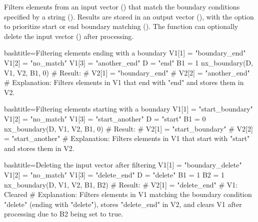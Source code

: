 \begin{NexMainBox}
	\begin{NexMainBox}
		Filters elements from an input vector () that match the boundary conditions specified by a string (). Results are stored in an output vector (), with the option to prioritize start or end boundary matching (). The function can optionally delete the input vector () after processing.
	\end{NexMainBox}
	\begin{NexMainBox}
		\begin{NexListDark}
		\end{NexListDark}
	\end{NexMainBox}
\end{NexMainBox}

\begin{NexCodeBox}{bash}{title={Filtering elements ending with a boundary}}
	V1[1] = "boundary_end"
	V1[2] = "no_match"
	V1[3] = "another_end"
	D = "end"
	B1 = 1
	nx_boundary(D, V1, V2, B1, 0)
	# Result:
	# V2[1] = "boundary_end"
	# V2[2] = "another_end"
	# Explanation: Filters elements in V1 that end with "end" and stores them in V2.
\end{NexCodeBox}

\begin{NexCodeBox}{bash}{title={Filtering elements starting with a boundary}}
	V1[1] = "start_boundary"
	V1[2] = "no_match"
	V1[3] = "start_another"
	D = "start"
	B1 = 0
	nx_boundary(D, V1, V2, B1, 0)
	# Result:
	# V2[1] = "start_boundary"
	# V2[2] = "start_another"
	# Explanation: Filters elements in V1 that start with "start" and stores them in V2.
\end{NexCodeBox}

\begin{NexCodeBox}{bash}{title={Deleting the input vector after filtering}}
	V1[1] = "boundary_delete"
	V1[2] = "no_match"
	V1[3] = "delete_end"
	D = "delete"
	B1 = 1
	B2 = 1
	nx_boundary(D, V1, V2, B1, B2)
	# Result:
	# V2[1] = "delete_end"
	# V1: Cleared
	# Explanation: Filters elements in V1 matching the boundary condition "delete" (ending with "delete"), stores "delete_end" in V2, and clears V1 after processing due to B2 being set to true.
\end{NexCodeBox}

